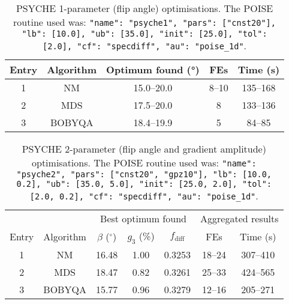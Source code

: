 \begin{table}
    \centering
    \begin{tabular}{ccccc}
        \toprule
       Entry & Algorithm & Optimum found (\unit{\degree}) & FEs   & Time (\unit{\s}) \\
        \midrule
        1     & NM        & 15.0--20.0                   & 8--10 & 135--168             \\
        2     & MDS       & 17.5--20.0                   & 8     & 133--136             \\
        3     & BOBYQA    & 18.4--19.9                   & 5     & 84--85               \\
        \bottomrule
    \end{tabular}
    \caption[PSYCHE 1-parameter optimisations]{
        PSYCHE 1-parameter (flip angle) optimisations.
        The POISE routine used was: \texttt{{"name": "psyche1", "pars": ["cnst20"], "lb": [10.0], "ub": [35.0], "init": [25.0], "tol": [2.0], "cf": "specdiff", "au": "poise_1d"}}.
    }
    \label{tbl:poise_psyche1p}
\end{table}

\begin{table}
    \centering
    \begin{tabular}{ccccccc}
        \toprule
              &           & \multicolumn{3}{c}{Best optimum found}            & \multicolumn{2}{c}{Aggregated results} \\
                            \cmidrule(lr){3-5}                                  \cmidrule(lr){6-7}
        Entry & Algorithm & $\beta$ ($^\circ$) & $g_3$ (\%) & $f_\text{diff}$ & FEs    & Time (\unit{\s}) \\
        \midrule
        1     & NM        & 16.48              & 1.00       & 0.3253          & 18--24 & 307--410             \\
        2     & MDS       & 18.47              & 0.82       & 0.3261          & 25--33 & 424--565             \\
        3     & BOBYQA    & 15.77              & 0.96       & 0.3279          & 12--16 & 205--271             \\
        \bottomrule
    \end{tabular}
    \caption[PSYCHE 2-parameter optimisations]{
        PSYCHE 2-parameter (flip angle and gradient amplitude) optimisations.
        The POISE routine used was: \texttt{{"name": "psyche2", "pars": ["cnst20", "gpz10"], "lb": [10.0, 0.2], "ub": [35.0, 5.0], "init": [25.0, 2.0], "tol": [2.0, 0.2], "cf": "specdiff", "au": "poise_1d"}}.
    }
    \label{tbl:poise_psyche2p}
\end{table}

